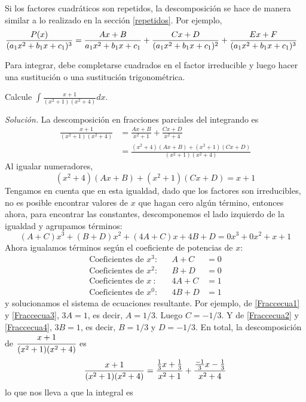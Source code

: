 Si los factores cuadráticos son repetidos, la descomposición se hace de manera similar a lo realizado en la sección \ref{repetidos}. Por ejemplo,
{\footnotesize
\begin{align*}
\frac{P(x)}{(a_{1}x^{2}+b_{1}x+c_{1})^{3}}&=\frac{Ax+B}{%
a_{1}x^{2}+b_{1}x+c_{1}}+\frac{Cx+D}{(a_{1}x^{2}+b_{1}x+c_{1})^{2}}
+\frac{Ex+F}{(a_{1}x^{2}+b_{1}x+c_{1})^{3}}
\end{align*}
}

Para integrar, debe completarse cuadrados en el factor irreducible y luego hacer una sustitución o una sustitución trigonométrica.


\begin{ejemplo}
Calcule $\displaystyle{\int \frac{x+1}{(x^{2}+1)(x^{2}+4)}dx}$.
\end{ejemplo}
\textit{Solución.} La descomposición en fracciones parciales del integrando es
{\small
\begin{align*}
\frac{x+1}{(x^{2}+1)(x^{2}+4)}&=\frac{Ax+B}{x^{2}+1}+\frac{Cx+D}{x^{2}+4}\\
&=\frac{(x^{2}+4)(Ax+B)+(x^{2}+1)(Cx+D)}{(x^{2}+1)(x^{2}+4)}
\end{align*}
}
Al igualar numeradores,
\[
(x^{2}+4)(Ax+B)+(x^{2}+1)(Cx+D)=x+1
\]
Tengamos en cuenta que en esta igualdad, dado que los factores son irreducibles, no es posible encontrar valores de $x$ que hagan cero algún término, entonces ahora, para encontrar las constantes, descomponemos el lado izquierdo de la igualdad y agrupamos términos:
\[
(A+C)x^3+(B+D)x^2+(4A+C)x+4B+D=0x^3+0x^2+x+1
\]
Ahora igualamos términos según el coeficiente de potencias de $x$:
\begin{align}
\text{Coeficientes de } x^3:& & A+C&=0 \label{Fraccecua1}\\
\text{Coeficientes de } x^2:& & B+D&=0 \label{Fraccecua2}\\
\text{Coeficientes de } x\ :& & 4A+C&=1 \label{Fraccecua3}\\
\text{Coeficientes de } x^0:& & 4B+D&=1 \label{Fraccecua4}
\end{align}
y solucionamos el sistema de ecuaciones resultante. Por ejemplo, de
\eqref{Fraccecua1} y \eqref{Fraccecua3}, $3A=1$, es decir, $A=1/3$. Luego $C=-1/3$. Y de \eqref{Fraccecua2} y \eqref{Fraccecua4}, $3B=1$, es decir, $B=1/3$ y $D=-1/3$. En total, la descomposición de $\cfrac{x+1}{(x^{2}+1)(x^{2}+4)}$ es
\[
\frac{x+1}{(x^{2}+1)(x^{2}+4)}=\frac{\frac{1}{3}x+\frac{1}{3}}{%
x^{2}+1}+\frac{\frac{-1}{3}x-\frac{1}{3}}{x^{2}+4}
\]
lo que nos lleva a que la integral es

